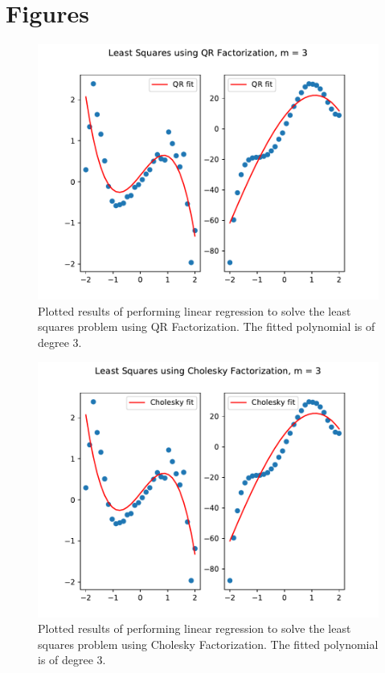 \documentclass[12pt]{article}
\begin{document}
\section{Figures}
\begin{figure}[h]
	\includegraphics[width = \textwidth]{figures/QR_3.pdf}
	\caption{Plotted results of performing linear regression to solve the least squares
		problem using QR Factorization. The fitted polynomial is of degree 3.}
	\label{fig:qr-3}
\end{figure}
\begin{figure}[h]

	\includegraphics[width = \textwidth]{figures/Cholesky_3.pdf}
	\caption{Plotted results of performing linear regression to solve the least squares
		problem using Cholesky Factorization. The fitted polynomial is of degree 3.}
	\label{fig:cholesky-3}
\end{figure}
\end{document}
